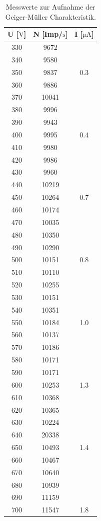 \begin{table}
  \label{tab:Messwerte}
  \centering
  \caption{Messwerte zur Aufnahme der Geiger-Müller Charakteristik.}
  \begin{tabular}{c c c}
      \toprule
      {U [$\si{\volt}$]} & {N [Imp/$\si{\second}$]} & {I [$\si{\micro\ampere}$]}\\
      \midrule
      330& 9672 \\
      340& 9580 \\
      350& 9837& 0.3 \\
      360& 9886\\
      370& 10041\\
      380& 9996 \\
      390& 9943 \\
      400& 9995& 0.4 \\
      410& 9980 \\
      420& 9986 \\
      430& 9960 \\
      440& 10219\\
      450& 10264& 0.7 \\
      460& 10174 \\
      470& 10035 \\
      480& 10350 \\
      490& 10290 \\
      500& 10151& 0.8 \\
      510& 10110 \\
      520& 10255 \\
      530& 10151 \\
      540& 10351 \\
      550& 10184& 1.0 \\
      560& 10137 \\
      570& 10186 \\
      580& 10171 \\
      590& 10171 \\
      600& 10253& 1.3 \\
      610& 10368 \\
      620& 10365 \\
      630& 10224 \\
      640& 20338 \\
      650& 10493& 1.4 \\
      660& 10467\\
      670& 10640\\
      680& 10939\\
      690& 11159\\
      700& 11547& 1.8 \\
      \bottomrule
    \end{tabular}
\end{table}